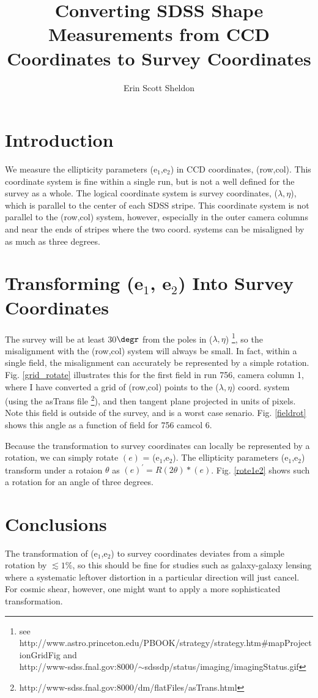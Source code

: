 \documentclass[preprint]{aastex}
\def\eone{e$_1$}
\def\etwo{e$_2$}
\begin{document}
\title{Converting SDSS Shape Measurements from CCD Coordinates to Survey
Coordinates}

\author{Erin Scott Sheldon}

\section{Introduction}
We measure the ellipticity parameters (\eone,\etwo) in CCD coordinates,
(row,col). This coordinate system is fine within a single run, but is not a 
well defined for the survey as a whole.  The logical coordinate system is 
survey coordinates, ($\lambda,\eta$), which is parallel to the center of 
each SDSS stripe.  This coordinate
system is not parallel to the (row,col) system, however, especially in the
outer camera columns and near the ends of stripes where the two coord. systems
can be misaligned by as much as three degrees.

\section{Transforming (\eone, \etwo) Into Survey Coordinates}
The survey will be at least 30$\degr$ from the poles in ($\lambda,\eta$) 
\footnote{see
http://www.astro.princeton.edu/PBOOK/strategy/strategy.htm\#mapProjectionGridFig and\\
http://www-sdss.fnal.gov:8000/$\sim$sdssdp/status/imaging/imagingStatus.gif},
so the misalignment with the (row,col) system will always be small. In fact, 
within a single field, the 
misalignment can accurately be represented by a simple
rotation. Fig. \ref{grid_rotate} illustrates this for the first field in 
run 756, camera column 1, where I have converted a grid of (row,col) points
to the ($\lambda, \eta$) coord. system (using the asTrans file
\footnote{http://www-sdss.fnal.gov:8000/dm/flatFiles/asTrans.html}), and 
then tangent plane projected
in units of pixels. Note this field is outside of the survey, and is a 
worst case senario. Fig. \ref{fieldrot} shows this angle as a function
of field for 756 camcol 6.

Because the transformation to survey coordinates can locally be represented
by a rotation, we can simply rotate $(e)$ = (\eone,\etwo). The ellipticity
parameters (\eone,\etwo) 
transform under a rotaion $\theta$ as $(e)^\prime = R(2\theta)*(e)$. 
Fig. \ref{rote1e2} shows such a rotation for an angle of three degrees.

\section{Conclusions} 
The transformation of (\eone,\etwo) to survey coordinates 
deviates from a simple
rotation by $\lesssim 1\%$, so this should be fine for studies such
as galaxy-galaxy lensing where a systematic leftover distortion in 
a particular direction will just cancel. For cosmic shear, however, 
one might want to apply a more sophisticated transformation.
\end{document}
